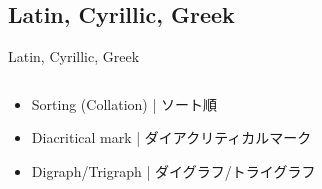\documentclass[aspectratio=169,10pt]{beamer}
\begin{document}
\subsection{Latin, Cyrillic, Greek}
\begin{frame}{Latin, Cyrillic, Greek}
\begin{columns}
\begin{column}{120mm}
\begin{center}
\large
  \begin{itemize}
    \item Sorting (Collation) | ソート順
    \item Diacritical mark | ダイアクリティカルマーク
    \item Digraph/Trigraph | ダイグラフ/トライグラフ
  \end{itemize}
\end{center}
\end{column}
\end{columns}
\end{frame}

\end{document}
